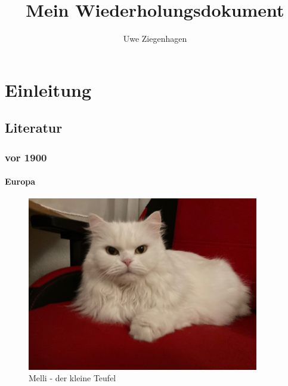 \documentclass[12pt,ngerman,parkskip=half]{scrreprt}
\title{Mein Wiederholungsdokument}
\author{Uwe Ziegenhagen}
\begin{document}
\maketitle

\tableofcontents

\listoffigures

\listoftables

\chapter{Einleitung}

\section{Literatur}

\subsection{vor 1900}

\subsubsection{Europa}

\blindtext[3]

\begin{figure}[h]
\begin{center}
\includegraphics[width=0.9\textwidth]{Bilder/Katze}
\caption{Melli - der kleine Teufel}\label{fig:Katze}
\end{center}
\end{figure}

\blindtext[3]

\blindtext
\end{document}
